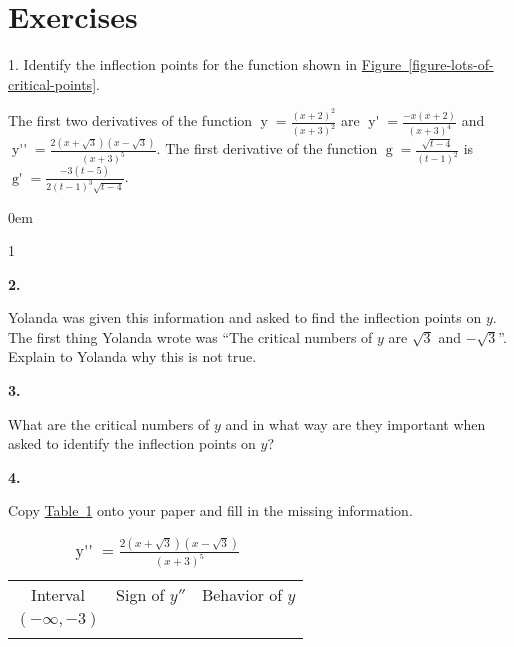 \documentclass[12pt,]{book}
\theoremstyle{plain}
\theoremstyle{definition}
\numberwithin{equation}{section}
\newcommand{\hrulethin}  {\noalign{\hrule height 0.04em}}
\newcommand{\hrulemedium}{\noalign{\hrule height 0.07em}}
\newcommand{\hrulethick} {\noalign{\hrule height 0.11em}}
\newenvironment{exercisegroup}%
{\medskip\noindent}%
{\par\bigskip}%
\newlength{\exercisegroupindent}%
\newlength{\exercisegroupitemwidth}%
\newenvironment{exercisegrouplist}%
{\vspace{-\partopsep}%
\begin{adjustwidth}{\exercisegroupindent}{0em}}%
{\end{adjustwidth}%
\vspace{-\partopsep}%
\vspace{\baselineskip}}%
\newenvironment{exercisegroupbycol}[1]%
{\begin{exercisegrouplist}%
\vspace{-\multicolsep}%
\begin{multicols}{#1}%
\setlength{\parindent}{0em}%
\setlength{\exercisegroupitemwidth}{\linewidth}}%
{\end{multicols}%
\vspace{-\multicolsep}%
\end{exercisegrouplist}}%
\newenvironment{exercisegroupitem}[1]%
{\begin{minipage}[t]{\exercisegroupitemwidth}
\vspace{0pt}%
{\bfseries#1}%
\rule{0pt}{\baselineskip}}{\strut%
\end{minipage}%
\hspace{\columnsep}}%
\providecommand\phantomsection{}
\newcommand{\fe}[2]{\mathop{{#1}{\left(#2\right)}}}
\newcommand{\ointerval}[2]{\left(#1,#2\right)}
\newcommand{\fd}[1]{#1'}
\newcommand{\sd}[1]{#1''}
\begin{document}
\section*{Exercises}\label{exercises-5}

\begin{exerciselist}
\item[1.]\phantomsection\hypertarget{exercise-37}{\null}Identify the inflection points for the function shown in \hyperref[figure-lots-of-critical-points]{Figure~\ref*{figure-lots-of-critical-points}}.%
\par\smallskip
\begin{exercisegroup}%
The first two derivatives of the function \(\fe{y}{x}=\frac{(x+2)^2}{(x+3)^2}\) are \(\fe{\fd{y}}{x}=\frac{-x(x+2)}{(x+3)^4}\) and \(\fe{\sd{y}}{x}=\frac{2(x+\sqrt{3})(x-\sqrt{3})}{(x+3)^5}\). The first derivative of the function \(\fe{g}{t}=\frac{\sqrt{t-4}}{(t-1)^2}\) is \(\fe{\fd{g}}{t}=\frac{-3(t-5)}{2(t-1)^3\sqrt{t-4}}\).%
\par
\begin{exercisegroupbycol}{1}%
\begin{exercisegroupitem}{2. }\phantomsection\hypertarget{exercise-38}{\null}
Yolanda was given this information and asked to find the inflection points on \(y\).  The first thing Yolanda wrote was ``The critical numbers of \(y\) are \(\sqrt{3}\) and \(-\sqrt{3}\)''.  Explain to Yolanda why this is not true.%
\end{exercisegroupitem}%
\par%
\begin{exercisegroupitem}{3. }\phantomsection\hypertarget{exercise-39}{\null}
What are the critical numbers of \(y\) and in what way are they important when asked to identify the inflection points on \(y\)?%
\end{exercisegroupitem}%
\par%
\begin{exercisegroupitem}{4. }\phantomsection\hypertarget{exercise-40}{\null}
Copy \hyperref[table-second-derivative-signs]{Table~\ref*{table-second-derivative-signs}} onto your paper and fill in the missing information.%
\begin{table}
\centering
\caption{\(\fe{\sd{y}}{x}=\frac{2\left(x+\sqrt{3}\right)\left(x-\sqrt{3}\right)}{(x+3)^5}\)\label{table-second-derivative-signs}}
\begin{tabular}{ccc}\hrulethick
Interval&Sign of \(\sd{y}\)&Behavior of \(y\)\\\hrulemedium
\(\ointerval{-\infty}{-3}\)&&\\\hrulethin

\end{tabular}
\end{table}
\end{exercisegroupitem}
\end{exercisegroupbycol}
\end{exercisegroup}
\end{exerciselist}
\end{document}
